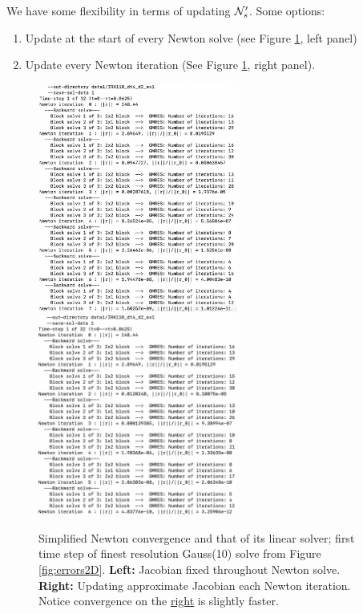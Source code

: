 \documentclass[review]{siamart}
\begin{document}
We have some flexibility in terms of updating ${\cal N}'_s$. Some options:
\begin{enumerate}
\setlength\itemsep{0.5em}
\item Update at the start of every Newton solve (see Figure \ref{fig:simple_newton_convergence}, left panel)

\item Update every Newton iteration (See Figure \ref{fig:simple_newton_convergence}, right panel).
\end{enumerate}

\begin{figure}[H]
\centerline{
\includegraphics[width = 0.585\textwidth]{figures/simple_newton_basic}
\quad
\includegraphics[width = 0.585\textwidth]{figures/simple_newton_better}
}
\caption{Simplified Newton convergence and that of its linear solver; first time step of finest resolution Gauss(10) solve from Figure \ref{fig:errors2D}.
\textbf{Left:} Jacobian fixed throughout Newton solve. \textbf{Right:} Updating approximate Jacobian each Newton iteration. Notice convergence on the \underline{right} is slightly faster.
\label{fig:simple_newton_convergence}
}
\end{figure}
\end{document}
